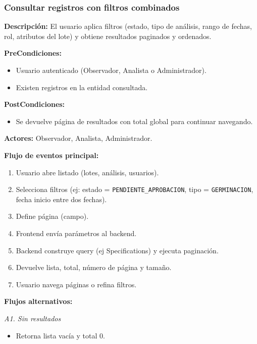 \subsubsection{Consultar registros con filtros combinados}

\textbf{Descripción:} El usuario aplica filtros (estado, tipo de análisis, rango de fechas, rol, atributos del lote) y obtiene resultados paginados y ordenados.

\vspace{0.5em}
\noindent\textbf{PreCondiciones:}
\begin{itemize}[nosep]
    \item Usuario autenticado (Observador, Analista o Administrador).
    \item Existen registros en la entidad consultada.
\end{itemize}

\vspace{0.5em}
\noindent\textbf{PostCondiciones:}
\begin{itemize}[nosep]
    \item Se devuelve página de resultados con total global para continuar navegando.
\end{itemize}

\vspace{0.5em}
\noindent\textbf{Actores:} Observador, Analista, Administrador.

\vspace{0.5em}
\noindent\textbf{Flujo de eventos principal:}
\begin{enumerate}[nosep]
    \item Usuario abre listado (lotes, análisis, usuarios).
    \item Selecciona filtros (ej: estado = \texttt{PENDIENTE\_APROBACION}, tipo = \texttt{GERMINACION}, fecha inicio entre dos fechas).
    \item Define página (campo).
    \item Frontend envía parámetros al backend.
    \item Backend construye query (ej Specifications) y ejecuta paginación.
    \item Devuelve lista, total, número de página y tamaño.
    \item Usuario navega páginas o refina filtros.
\end{enumerate}

\vspace{0.5em}
\noindent\textbf{Flujos alternativos:}

\vspace{0.3em}
\noindent\textit{A1. Sin resultados}
\begin{itemize}[nosep]
    \item Retorna lista vacía y total 0.
\end{itemize}

